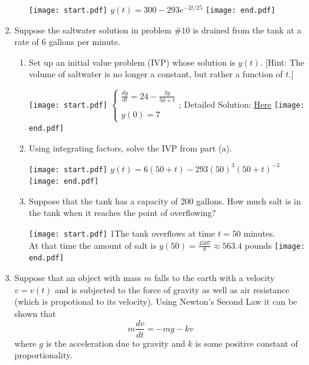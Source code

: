 \documentclass[12pt]{article}
\begin{document}
\begin{enumerate}
\begin{enumerate}
\texttt{[image: start.pdf]}
{{$y(t)=300-293e^{-2t/25}$}}
\texttt{[image: end.pdf]}


\end{enumerate}

\item Suppose the saltwater solution in problem $\#10$ is drained from the tank at a rate of 6 gallons per minute.

\begin{enumerate}

\item Set up an initial value problem (IVP) whose solution is $y(t)$.  [Hint: The volume of saltwater is no longer a constant, but rather a function of $t$.]

\texttt{[image: start.pdf]}
{{$\left\{\begin{array}{l}
\frac{dy}{dt}=24-\frac{3y}{50+t}\\
\\
y(0)=7
\end{array}\right.$; Detailed Solution: \textcolor{blue}{\href{http://www.math.drexel.edu/classes/Calculus/resources/Math123HW/Solutions/123_03_Integrating_Factors_11.pdf}{Here}}}}
\texttt{[image: end.pdf]}



\item Using integrating factors, solve the IVP from part (a).  

\texttt{[image: start.pdf]}
{{$y(t)=6(50+t)-293(50)^3(50+t)^{-3}$}}
\texttt{[image: end.pdf]}


\item Suppose that the tank has a capacity of 200 gallons.  How much salt is in the tank when it reaches the point of overflowing?

\texttt{[image: start.pdf]}
{{{1\linewidth}{The tank overflows at time $t=50$ minutes.  \\ At that time the amount of salt is $y\left(50\right)=\frac{4507}{8}\approx563.4$ pounds}}}
\texttt{[image: end.pdf]}


\end{enumerate}

\item Suppose that an object with mass $m$ falls to the earth with a velocity $v=v(t)$ and is subjected to the force of gravity as well as air resistance (which is propotional to 
its velocity).  Using Newton's Second Law it can be shown that $$m\frac{dv}{dt}=-mg-kv$$ where $g$ is the acceleration due to gravity and $k$ is some positive constant of proportionality.


\end{enumerate}
\end{document}
